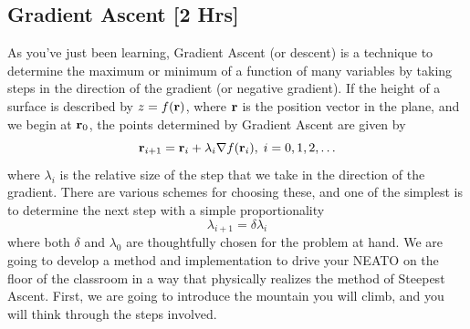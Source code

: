 \documentclass[M3_Night4_Solutions]{subfiles}
\begin{document}
\begin{enumerate}[resume=exercises, label=\textbf{Exercise} (\arabic*)]
%


\section{Gradient Ascent [2 Hrs]}
As you've just been learning, Gradient Ascent (or descent) is a technique to determine the maximum or minimum of a function of many variables by taking steps in the direction of the gradient (or negative gradient). If the height of a surface is described by $z = f(\mathbf{r})$, where $\mathbf{r}$ is the position vector in the plane, and we begin at $\mathbf{r}_0$, the points determined by Gradient Ascent are given by
\[\mathbf{r}_{i+1} = \mathbf{r}_{i} + \lambda_{i} \nabla f(\mathbf{r}_i), \; i = 0,1,2, \ldots \]
where $\lambda_{i}$ is the relative size of the step that we take in the direction of the gradient. There are various schemes for choosing these, and one of the simplest is to determine the next step with a simple proportionality
\[\lambda_{i+1} = \delta \lambda_{i} \]
where both $\delta$ and $\lambda_0$ are thoughtfully chosen for the problem at hand. We are going to develop a method and implementation to drive your NEATO on the floor of the classroom in a way that physically realizes the method of Steepest Ascent. First, we are going to introduce the mountain you will climb, and you will think through the steps involved.


\end{enumerate}
\end{document}
